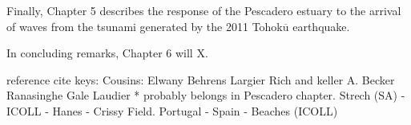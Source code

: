 Finally, Chapter 5 describes the response of the Pescadero estuary to the arrival of waves from the tsunami generated by the 2011 Tohok$\overline{\mathrm{u}}$ earthquake. 

In concluding remarks, Chapter 6 will X. 











reference cite keys:
Cousins: \cite{cousins_effects_2010,cousins_hydrodynamics_2011}
Elwany \cite{elwany_opening_1998}
Behrens \cite{behrens_characterization_2009,behrens_episodic_2013}
Largier \cite{largier_structure_1986,slinger_evolution_1990,largier_circulation_1991,largier_dynamics_1991,largier_stratified_1992,largier_tidal_1992,largier_seasonally_1997}
Rich and keller \cite{rich_hydrologic_2013}
A. Becker \cite{becker_artificial_2009}
Ranasinghe \cite{ranasinghe_flushing_1998,ranasinghe_circulation_1999,ranasinghe_morphodynamic_1999,ranasinghe_seasonal_2003}
Gale \cite{gale_vertical_2006,gale_processes_2007}
Laudier \cite{laudier_measured_2011} * probably belongs in Pescadero chapter.
Strech (SA) - \cite{stretch_breaching_2006,parkinson_breaching_2007}
ICOLL - \cite{haines_morphometric_2006,baldock_morphodynamic_2008,davidson_simple_2009}
Hanes - Crissy Field. \cite{hanes_waves_2011}
Portugal - \cite{fortunato_morphological_2014}
Spain - \cite{moreno_morphodynamics_2010}
\cite{uncles_infragravity_2014}
Beaches (ICOLL)  \cite{weir_beach_2006}







